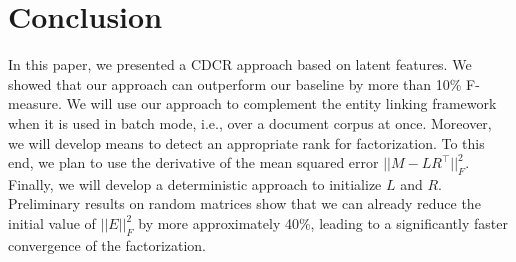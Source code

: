
\section{Conclusion}
\label{cha314:sec:conclusion}
In this paper, we presented a CDCR approach based on latent features.
We showed that our approach can outperform our baseline by more than 10\% F-measure.
We will use our approach to complement the entity linking framework~\cite{agdistis_iswc} when it is used in batch mode, i.e., over a document corpus at once.
Moreover, we will develop means to detect an appropriate rank for factorization.
To this end, we plan to use the derivative of the mean squared error $||M - LR^{\top}||^2_F$.
Finally, we will develop a deterministic approach to initialize $L$ and $R$. 
Preliminary results on random matrices show that we can already reduce the initial value of $||E||^2_F$ by more approximately 40\%, leading to a significantly faster convergence of the factorization.



%

